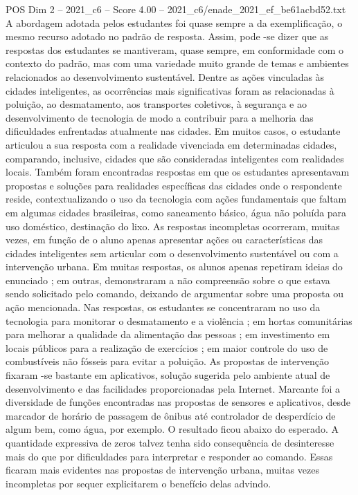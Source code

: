 \begin{textsample}{POS Dim 2 – 2021\_c6 – Score 4.00 – 2021\_c6/enade\_2021\_ef\_be61acbd52.txt}
A abordagem adotada pelos estudantes foi quase sempre a da exemplificação, o mesmo recurso adotado no padrão de resposta.
Assim, pode -se dizer que as respostas dos estudantes se mantiveram, quase sempre, em conformidade com o contexto do padrão, mas com uma variedade muito grande de temas e ambientes relacionados ao desenvolvimento sustentável.
Dentre as ações vinculadas às cidades inteligentes, as ocorrências mais significativas foram as relacionadas à poluição, ao desmatamento, aos transportes coletivos, à segurança e ao desenvolvimento de tecnologia de modo a contribuir para a melhoria das dificuldades enfrentadas atualmente nas cidades.
Em muitos casos, o estudante articulou a sua resposta com a realidade vivenciada em determinadas cidades, comparando, inclusive, cidades que são consideradas inteligentes com realidades locais.
Também foram encontradas respostas em que os estudantes apresentavam propostas e soluções para realidades específicas das cidades onde o respondente reside, contextualizando o uso da tecnologia com ações fundamentais que faltam em algumas cidades brasileiras, como saneamento básico, água não poluída para uso doméstico, destinação do lixo.
As respostas incompletas ocorreram, muitas vezes, em função de o aluno apenas apresentar ações ou características das cidades inteligentes sem articular com o desenvolvimento sustentável ou com a intervenção urbana.
Em muitas respostas, os alunos apenas repetiram ideias do enunciado ; em outras, demonstraram a não compreensão sobre o que estava sendo solicitado pelo comando, deixando de argumentar sobre uma proposta ou ação mencionada.
Nas respostas, os estudantes se concentraram no uso da tecnologia para monitorar o desmatamento e a violência ; em hortas comunitárias para melhorar a qualidade da alimentação das pessoas ; em investimento em locais públicos para a realização de exercícios ; em maior controle do uso de combustíveis não fósseis para evitar a poluição.
As propostas de intervenção fixaram -se bastante em aplicativos, solução sugerida pelo ambiente atual de desenvolvimento e das facilidades proporcionadas pela Internet.
Marcante foi a diversidade de funções encontradas nas propostas de sensores e aplicativos, desde marcador de horário de passagem de ônibus até controlador de desperdício de algum bem, como água, por exemplo.
O resultado ficou abaixo do esperado.
A quantidade expressiva de zeros talvez tenha sido consequência de desinteresse mais do que por dificuldades para interpretar e responder ao comando.
Essas ficaram mais evidentes nas propostas de intervenção urbana, muitas vezes incompletas por sequer explicitarem o benefício delas advindo.

\end{textsample}
